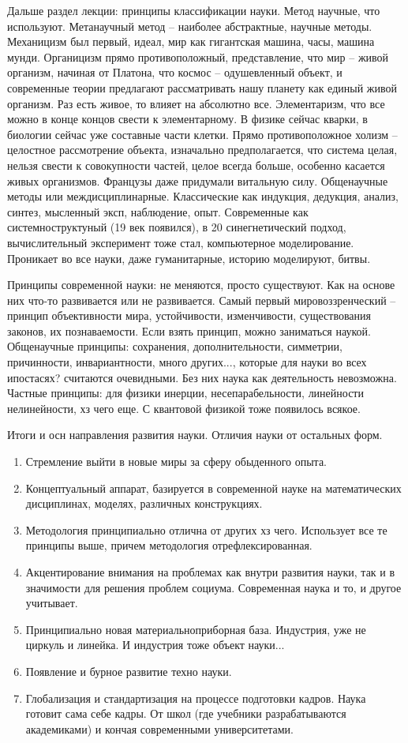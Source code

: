 \documentclass[a4paper, 12pt]{article}
\def\-{\babelhyphen{hard}}
\begin{document}
Дальше раздел лекции: принципы классификации науки. Метод научные, что 
используют. Метанаучный метод -- наиболее абстрактные, научные методы. 
Механицизм был первый, идеал, мир как гигантская машина, часы, машина 
мунди. Органицизм прямо противоположный, представление, что мир -- живой 
организм, начиная от Платона, что космос -- одушевленный объект, 
и современные теории предлагают рассматривать нашу планету как единый 
живой организм. Раз есть живое, то влияет на абсолютно все. 
Элементаризм, что все можно в конце концов свести к элементарному. 
В физике сейчас кварки, в биологии сейчас уже составные части клетки. 
Прямо противоположное холизм -- целостное рассмотрение объекта, 
изначально предполагается, что система целая, нельзя свести 
к совокупности частей, целое всегда больше, особенно касается живых 
организмов. Французы даже придумали витальную силу. Общенаучные методы 
или междисциплинарные. Классические как индукция, дедукция, анализ, 
синтез, мысленный эксп, наблюдение, опыт. Современные как 
системно\-структуный (19 век появился), в 20 синегнетический подход, 
вычислительный эксперимент тоже стал, компьютерное моделирование. 
Проникает во все науки, даже гуманитарные, историю моделируют, битвы.

Принципы современной науки: не меняются, просто существуют. Как на 
основе них что-то развивается или не развивается. Самый первый 
мировоззренческий -- принцип объективности мира, устойчивости, 
изменчивости, существования законов, их познаваемости. Если взять 
принцип, можно заниматься наукой. Общенаучные принципы: сохранения, 
дополнительности, симметрии, причинности, инвариантности, много 
других..., которые для науки во всех ипостасях? считаются очевидными. 
Без них наука как деятельность невозможна. Частные принципы: для физики 
инерции, несепарабельности, линейности нелинейности, хз чего еще. 
С квантовой физикой тоже появилось всякое.

Итоги и осн направления развития науки. Отличия науки от остальных форм. 
\begin{enumerate}
  \item Стремление выйти в новые миры за сферу обыденного опыта.
  \item Концептуальный аппарат, базируется в современной науке на 
    математических дисциплинах, моделях, различных конструкциях.
  \item Методология принципиально отлична от других хз чего. Использует 
    все те принципы выше, причем методология отрефлексированная.
  \item Акцентирование внимания на проблемах как внутри развития науки, 
    так и в значимости для решения проблем социума. Современная наука 
    и то, и другое учитывает.
  \item Принципиально новая материально\-приборная база. Индустрия, уже 
    не циркуль и линейка. И индустрия тоже объект науки...
  \item Появление и бурное развитие техно науки.
  \item Глобализация и стандартизация на процессе подготовки кадров. 
    Наука готовит сама себе кадры. От школ (где учебники разрабатываются 
    академиками) и кончая современными университетами.
\end{enumerate}
\end{document}

